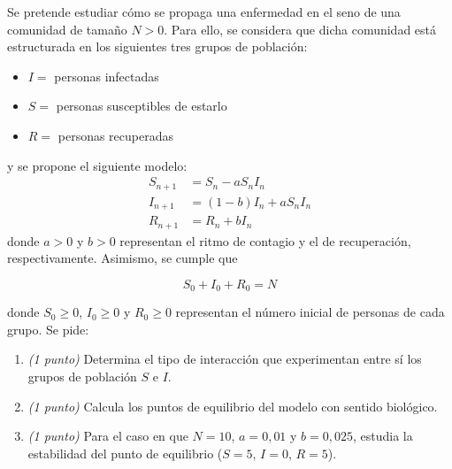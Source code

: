 \documentclass[12pt]{article}
\begin{document}
    \begin{ejercicio} Se pretende estudiar cómo se propaga una enfermedad en el seno de una comunidad de tamaño $N > 0$. Para ello, se considera que dicha comunidad está estructurada en los siguientes tres grupos de población:
        \begin{itemize}
            \item $I = $ personas infectadas
            \item $S = $ personas susceptibles de estarlo
            \item $R = $ personas recuperadas
        \end{itemize}
        y se propone el siguiente modelo:
        \begin{equation}
        \begin{aligned}
            S_{n+1} &= S_n - aS_nI_n \\
            I_{n+1} &= (1-b)I_n + aS_nI_n \\
            R_{n+1} &= R_n + bI_n
        \end{aligned}
        \end{equation}
        donde $a > 0$ y $b > 0$ representan el ritmo de contagio y el de recuperación, respectivamente. Asimismo, se cumple que
        
        $$S_0 + I_0 + R_0 = N$$
        
        donde $S_0 \ge 0$, $I_0 \ge 0$ y $R_0 \ge 0$ representan el número inicial de personas de cada grupo. Se pide:
        \begin{enumerate}[label=\alph*)]
            \item \textit{(1 punto)} Determina el tipo de interacción que experimentan entre sí los grupos de población $S$ e $I$.
            \item \textit{(1 punto)} Calcula los puntos de equilibrio del modelo con sentido biológico.
            \item \textit{(1 punto)} Para el caso en que $N = 10$, $a = 0{,}01$ y $b = 0{,}025$, estudia la estabilidad del punto de equilibrio ($S = 5$, $I = 0$, $R = 5$).
        \end{enumerate}
    \end{ejercicio}
\end{document}
